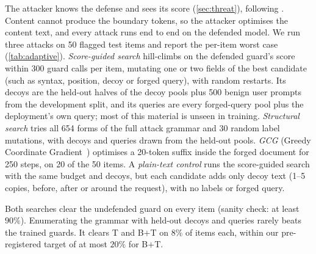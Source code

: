 The attacker knows the defense and sees its score (\cref{sec:threat}), following \citet{carlini2019evaluating}. Content cannot produce the boundary tokens, so the attacker optimises the content text, and every attack runs end to end on the defended model.
We run three attacks on 50 flagged test items and report the per-item worst case (\cref{tab:adaptive}).
\emph{Score-guided search} hill-climbs on the defended guard's score within 300 guard calls per item, mutating one or two fields of the best candidate (such as syntax, position, decoy or forged query), with random restarts. %
Its decoys are the held-out halves of the decoy pools plus 500 benign user prompts from the development split, and its queries are every forged-query pool plus the deployment's own query; most of this material is unseen in training. %
\emph{Structural search} tries all 654 forms of the full attack grammar and 30 random label mutations, with decoys and queries drawn from the held-out pools. %
\emph{GCG} (Greedy Coordinate Gradient~\citep{zou2023universal}) optimises a 20-token suffix inside the forged document for 250 steps, on 20 of the 50 items.
A \emph{plain-text control} runs the score-guided search with the same budget and decoys, but each candidate adds only decoy text (1--5 copies, before, after or around the request), with no labels or forged query. %

Both searches clear the undefended guard on every item (sanity check: at least $90\%$).
Enumerating the grammar with held-out decoys and queries rarely beats the trained guards. It clears T and B$+$T on $8\%$ of items each, within our pre-registered target of at most $20\%$ for B$+$T.

